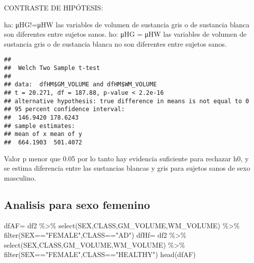 \documentclass[
]{article}
\newenvironment{Shaded}{\begin{snugshade}}{\end{snugshade}}
\newcommand{\AttributeTok}[1]{\textcolor[rgb]{0.77,0.63,0.00}{#1}}
\newcommand{\FunctionTok}[1]{\textcolor[rgb]{0.00,0.00,0.00}{#1}}
\newcommand{\NormalTok}[1]{#1}
\newcommand{\OtherTok}[1]{\textcolor[rgb]{0.56,0.35,0.01}{#1}}
\newcommand{\SpecialCharTok}[1]{\textcolor[rgb]{0.00,0.00,0.00}{#1}}
\newcommand{\StringTok}[1]{\textcolor[rgb]{0.31,0.60,0.02}{#1}}
\begin{document}
CONTRASTE DE HIPÓTESIS:

ha: μHG!=μHW las variables de volumen de sustancia gris o de sustancia
blanca son diferentes entre sujetos sanos. ho: μHG = μHW las variables
de volumen de sustancia gris o de sustancia blanca no son diferentes
entre sujetos sanos.

\begin{Shaded}
\end{Shaded}

\begin{verbatim}
## 
##  Welch Two Sample t-test
## 
## data:  dfHM$GM_VOLUME and dfHM$WM_VOLUME
## t = 20.271, df = 187.88, p-value < 2.2e-16
## alternative hypothesis: true difference in means is not equal to 0
## 95 percent confidence interval:
##  146.9420 178.6243
## sample estimates:
## mean of x mean of y 
##  664.1903  501.4072
\end{verbatim}

Valor p menor que 0.05 por lo tanto hay evidencia suficiente para
rechazar h0, y se estima diferencia entre las sustancias blancas y gris
para sujetos sanos de sexo masculino.

\hypertarget{analisis-para-sexo-femenino}{%
\subsection{Analisis para sexo
femenino}\label{analisis-para-sexo-femenino}}

\begin{Shaded}
\begin{Highlighting}[]
\NormalTok{dfAF}\OtherTok{=}\NormalTok{ df2 }\SpecialCharTok{\%\textgreater{}\%} \FunctionTok{select}\NormalTok{(SEX,CLASS,GM\_VOLUME,WM\_VOLUME) }\SpecialCharTok{\%\textgreater{}\%} \FunctionTok{filter}\NormalTok{(SEX}\SpecialCharTok{==}\StringTok{"FEMALE"}\NormalTok{,CLASS}\SpecialCharTok{==}\StringTok{"AD"}\NormalTok{)}
\NormalTok{dfHf}\OtherTok{=}\NormalTok{ df2 }\SpecialCharTok{\%\textgreater{}\%} \FunctionTok{select}\NormalTok{(SEX,CLASS,GM\_VOLUME,WM\_VOLUME) }\SpecialCharTok{\%\textgreater{}\%} \FunctionTok{filter}\NormalTok{(SEX}\SpecialCharTok{==}\StringTok{"FEMALE"}\NormalTok{,CLASS}\SpecialCharTok{==}\StringTok{"HEALTHY"}\NormalTok{)}
\FunctionTok{head}\NormalTok{(dfAF)}
\end{Highlighting}
\end{Shaded}
\end{document}
